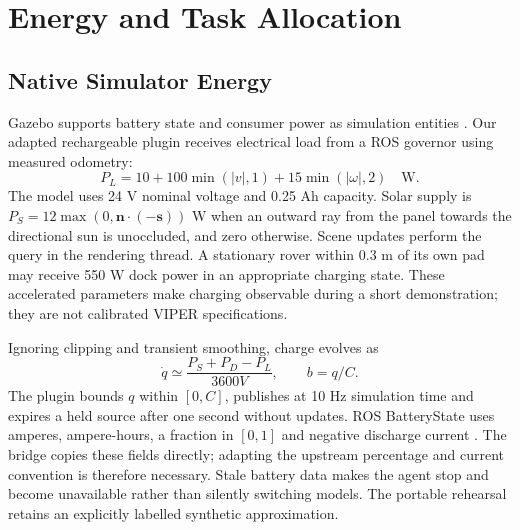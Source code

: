 \documentclass[conference]{IEEEtran}
\begin{document}
\section{Energy and Task Allocation}
\subsection{Native Simulator Energy}
Gazebo supports battery state and consumer power as simulation entities
\cite{battery}. Our adapted rechargeable plugin receives electrical load from a
ROS governor using measured odometry:
\begin{equation}
P_L=10+100\min(|v|,1)+15\min(|\omega|,2)\quad\mathrm{W}.
\end{equation}
The model uses 24 V nominal voltage and 0.25 Ah capacity. Solar supply is
$P_S=12\max(0,\mathbf n\cdot(-\mathbf s))$ W when an outward ray from the panel
towards the directional sun is unoccluded, and zero otherwise. Scene updates
perform the query in the rendering thread. A stationary rover within 0.3 m of
its own pad may receive 550 W dock power in an appropriate charging state.
These accelerated parameters make charging observable during a short
demonstration; they are not calibrated VIPER specifications.

Ignoring clipping and transient smoothing, charge evolves as
\begin{equation}
\dot q \simeq \frac{P_S+P_D-P_L}{3600 V},\qquad b=q/C.
\end{equation}
The plugin bounds $q$ within $[0,C]$, publishes at 10 Hz simulation time and
expires a held source after one second without updates. ROS BatteryState uses
amperes, ampere-hours, a fraction in $[0,1]$ and negative discharge current
\cite{batterystate}. The bridge copies these fields directly; adapting the
upstream percentage and current convention is therefore necessary.
Stale battery data makes the agent stop and become unavailable rather than
silently switching models. The portable rehearsal retains an explicitly
labelled synthetic approximation.
\end{document}
